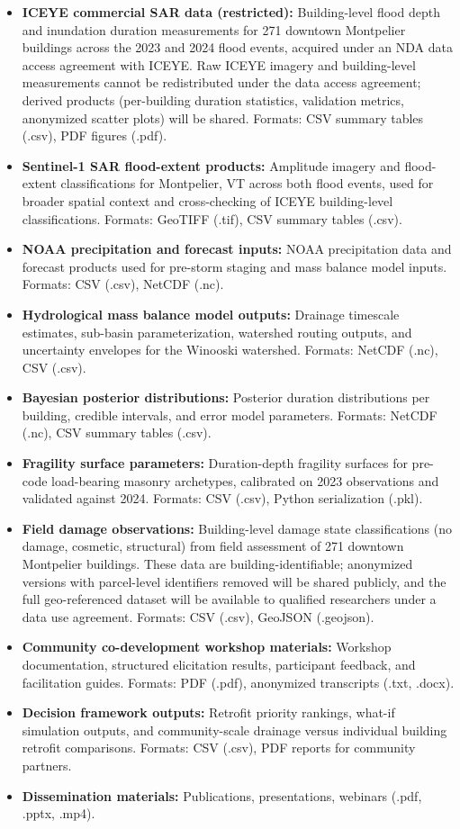 \documentclass[11pt]{article}
\begin{document}
\begin{itemize}
\item[] \textbf{ICEYE commercial SAR data (restricted):}
  Building-level flood depth and inundation duration measurements for 271 downtown
  Montpelier buildings across the 2023 and 2024 flood events, acquired under an NDA
  data access agreement with ICEYE.
  Raw ICEYE imagery and building-level measurements cannot be redistributed under
  the data access agreement; derived products (per-building duration statistics,
  validation metrics, anonymized scatter plots) will be shared.
  Formats: CSV summary tables (.csv), PDF figures (.pdf).
\item[] \textbf{Sentinel-1 SAR flood-extent products:}
  Amplitude imagery and flood-extent classifications for Montpelier, VT across both
  flood events, used for broader spatial context and cross-checking of ICEYE
  building-level classifications.
  Formats: GeoTIFF (.tif), CSV summary tables (.csv).
\item[] \textbf{NOAA precipitation and forecast inputs:}
  NOAA precipitation data and forecast products used for pre-storm staging and
  mass balance model inputs.
  Formats: CSV (.csv), NetCDF (.nc).
\item[] \textbf{Hydrological mass balance model outputs:}
  Drainage timescale estimates, sub-basin parameterization, watershed routing
  outputs, and uncertainty envelopes for the Winooski watershed.
  Formats: NetCDF (.nc), CSV (.csv).
\item[] \textbf{Bayesian posterior distributions:}
  Posterior duration distributions per building, credible intervals, and error
  model parameters.
  Formats: NetCDF (.nc), CSV summary tables (.csv).
\item[] \textbf{Fragility surface parameters:}
  Duration-depth fragility surfaces for pre-code load-bearing masonry archetypes,
  calibrated on 2023 observations and validated against 2024.
  Formats: CSV (.csv), Python serialization (.pkl).
\item[] \textbf{Field damage observations:}
  Building-level damage state classifications (no damage, cosmetic, structural)
  from field assessment of 271 downtown Montpelier buildings.
  These data are building-identifiable; anonymized versions with parcel-level
  identifiers removed will be shared publicly, and the full geo-referenced dataset
  will be available to qualified researchers under a data use agreement.
  Formats: CSV (.csv), GeoJSON (.geojson).
\item[] \textbf{Community co-development workshop materials:}
  Workshop documentation, structured elicitation results, participant feedback,
  and facilitation guides.
  Formats: PDF (.pdf), anonymized transcripts (.txt, .docx).
\item[] \textbf{Decision framework outputs:}
  Retrofit priority rankings, what-if simulation outputs, and community-scale
  drainage versus individual building retrofit comparisons.
  Formats: CSV (.csv), PDF reports for community partners.
\item[] \textbf{Dissemination materials:}
  Publications, presentations, webinars (.pdf, .pptx, .mp4).
\end{itemize}
\end{document}
